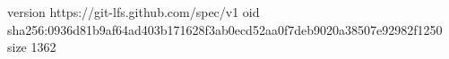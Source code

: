 version https://git-lfs.github.com/spec/v1
oid sha256:0936d81b9af64ad403b171628f3ab0ecd52aa0f7deb9020a38507e92982f1250
size 1362
